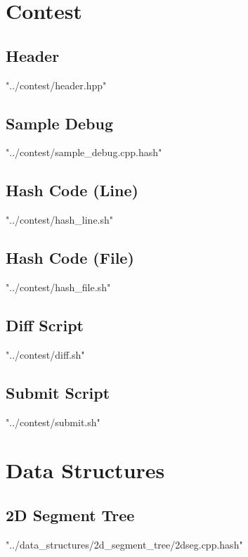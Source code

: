 \documentclass [a4paper,5pt,oneside, landscape]{article}
\begin{document}
\begin{multicols}{3}
\pagestyle{fancy}
\fancyfoot{}
\fancyhead[R]{\thepage}
\renewcommand{\headrulewidth}{0.4pt}
\tableofcontents
\scriptsize



\section{Contest}
\subsection{Header}
 {"../contest/header.hpp"}


\subsection{ Sample Debug}
 {"../contest/sample_debug.cpp.hash"}


\subsection{ Hash Code (Line)}
 {"../contest/hash_line.sh"}

\subsection{ Hash Code (File)}
 {"../contest/hash_file.sh"}

\subsection{ Diff Script}
 {"../contest/diff.sh"}

\subsection{ Submit Script}
 {"../contest/submit.sh"}


\section{Data Structures}
\subsection{ 2D Segment Tree}
 {"../data_structures/2d_segment_tree/2dseg.cpp.hash"}



\end{multicols}
\end{document}
